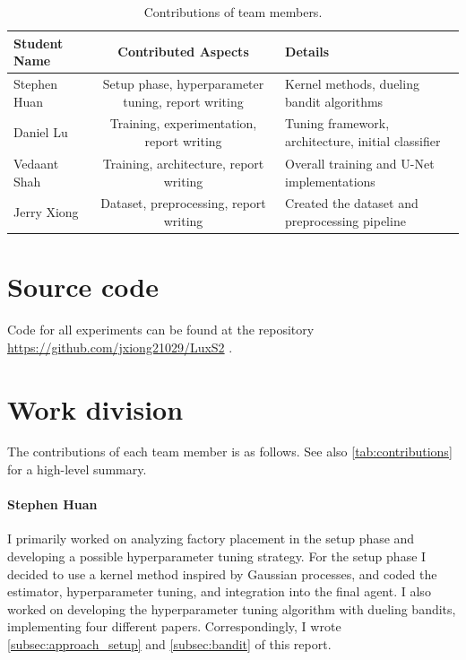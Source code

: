 \documentclass[10pt,twocolumn,letterpaper]{article}
\begin{document}
\begin{table}[t]
  \begin{center}
  \begin{tabular}{|l|c|l|}
    \hline
    Student Name & Contributed Aspects & Details \\
    \hline\hline
    Stephen Huan
      & Setup phase, hyperparameter tuning, report writing
      & Kernel methods, dueling bandit algorithms \\
    Daniel Lu
      & Training, experimentation, report writing
      & Tuning framework, architecture, initial classifier \\
    Vedaant Shah
      & Training, architecture, report writing
      & Overall training and U-Net implementations \\
    Jerry Xiong
      & Dataset, preprocessing, report writing
      & Created the dataset and preprocessing pipeline \\
    \hline
  \end{tabular}
  \end{center}
  \caption{Contributions of team members.}
  \label{tab:contributions}
\end{table}

\appendix

\section{Source code}

Code for all experiments can be found at the repository
{%
  \url{https://github.com/jxiong21029/LuxS2}%
}.

\section{Work division}


The contributions of each team member is as follows.
See also \autoref{tab:contributions} for a high-level summary.

\paragraph{Stephen Huan}

I primarily worked on analyzing factory placement in the setup
phase and developing a possible hyperparameter tuning strategy.
For the setup phase I decided to use a kernel method
inspired by Gaussian processes, and coded the estimator,
hyperparameter tuning, and integration into the final agent.
I also worked on developing the hyperparameter tuning algorithm
with dueling bandits, implementing four different papers.
Correspondingly, I wrote \autoref{subsec:approach_setup}
and \autoref{subsec:bandit} of this report.
\end{document}
